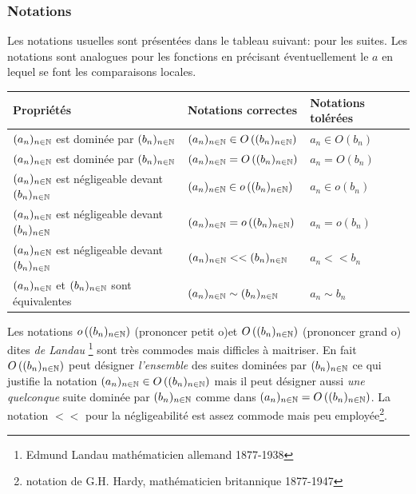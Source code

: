 \subsubsection{Notations}
Les notations usuelles sont présentées dans le tableau suivant: pour les suites. Les notations sont analogues pour les fonctions en précisant éventuellement le $a$ en lequel se font les comparaisons locales.
\begin{center}
\renewcommand{\arraystretch}{1.5}
\begin{tabular}{|l|l|l|}\hline 
 Propriétés & Notations correctes & Notations tolérées \\ \hline 
$(a_n)_{n\in \mathbb{N}}$ est dominée par $(b_n)_{n\in \mathbb{N}}$  & $(a_n)_{n\in\mathbb{N}} \in O\left((b_n)_{n\in \mathbb{N}}\right)$ & $a_n\in O(b_n)$\\ \hline
$(a_n)_{n\in \mathbb{N}}$ est dominée par $(b_n)_{n\in \mathbb{N}}$  & $(a_n)_{n\in\mathbb{N}} = O\left((b_n)_{n\in \mathbb{N}}\right)$ & $a_n= O(b_n)$\\ \hline
$(a_n)_{n\in \mathbb{N}}$ est négligeable devant $(b_n)_{n\in \mathbb{N}}$  & $(a_n)_{n\in\mathbb{N}} \in o\left((b_n)_{n\in \mathbb{N}}\right)$ & $a_n\in o(b_n)$\\ \hline
$(a_n)_{n\in \mathbb{N}}$ est négligeable devant $(b_n)_{n\in \mathbb{N}}$  & $(a_n)_{n\in\mathbb{N}} = o\left((b_n)_{n\in \mathbb{N}}\right)$ & $a_n= o(b_n)$\\ \hline
$(a_n)_{n\in \mathbb{N}}$ est négligeable devant $(b_n)_{n\in \mathbb{N}}$  & $(a_n)_{n\in\mathbb{N}} << (b_n)_{n\in \mathbb{N}}$ & $a_n << b_n$\\ \hline
$(a_n)_{n\in \mathbb{N}}$ et $(b_n)_{n\in \mathbb{N}}$ sont équivalentes & $ (a_n)_{n\in \mathbb{N}} \sim (b_n)_{n\in \mathbb{N}}$ & $a_n \sim b_n $\\ \hline
\end{tabular}
\end{center}
Les notations $o\left((b_n)_{n\in \mathbb{N}}\right)$  (prononcer \og petit o\fg )et $O\left((b_n)_{n\in \mathbb{N}}\right)$ (prononcer \og grand o\fg ) dites \emph{de Landau} \footnote{Edmund Landau mathématicien allemand 1877-1938}  sont très commodes mais difficles à maitriser.\newline
En fait $O\left((b_n)_{n\in \mathbb{N}}\right)$ peut désigner \emph{l'ensemble} des suites dominées par $(b_n)_{n\in \mathbb{N}}$ ce qui justifie la notation $(a_n)_{n\in\mathbb{N}} \in O\left((b_n)_{n\in \mathbb{N}}\right)$ mais il peut désigner aussi \emph{une quelconque} suite dominée par $(b_n)_{n\in \mathbb{N}}$ comme dans $(a_n)_{n\in\mathbb{N}} = O\left((b_n)_{n\in \mathbb{N}}\right)$.\newline
La notation $<<$ pour la négligeabilité est assez commode mais peu employée\footnote{notation de G.H. Hardy, mathématicien britannique 1877-1947}.

